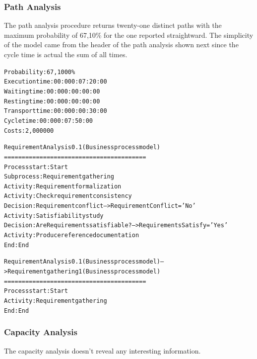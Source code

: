 \subsubsection{Path Analysis}
The path analysis procedure returns twenty-one distinct paths with the maximum probability of 67,10\% for the one reported straightward. The simplicity of the model came from the header of the path analysis shown next since the cycle time is actual the sum of all times.

\begin{alltt}
Probability:   67,1000\%
Execution time:  00:000:07:20:00
Waiting time:  00:000:00:00:00
Resting time:  00:000:00:00:00
Transport time:  00:000:00:30:00
Cycle time:  00:000:07:50:00
Costs:  2,000000

Requirement Analysis 0.1 (Business process model)
========================================
Process start: Start
Subprocess: Requirement gathering
Activity: Requirement formalization
Activity: Check requirement consistency
Decision: Requirement conflict --> RequirementConflict = 'No'
Activity: Satisfiability study
Decision: Are Requirements satisfiable? --> RequirementsSatisfy = 'Yes'
Activity: Produce reference documentation
End: End

Requirement Analysis 0.1 (Business process model) --> Requirement gathering 1 (Business process model)
========================================
Process start: Start
Activity: Requirement gathering
End: End
\end{alltt}


\subsubsection{Capacity Analysis}
The capacity analysis doesn't reveal any interesting information.

